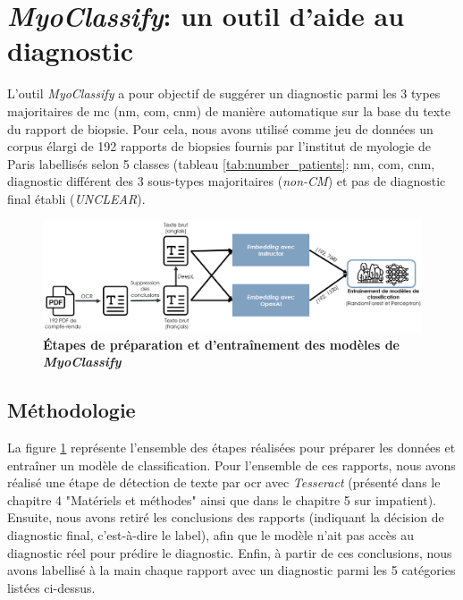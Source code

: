 \section{\textit{MyoClassify}: un outil d'aide au diagnostic}
L'outil \textit{MyoClassify} a pour objectif de suggérer un diagnostic parmi les 3 types majoritaires de \gls{mc} (\gls{nm}, \gls{com}, \gls{cnm}) de manière automatique sur la base du texte du rapport de biopsie. Pour cela, nous avons utilisé comme jeu de données un corpus élargi de 192 rapports de biopsies fournis par l'institut de myologie de Paris labellisés selon 5 classes (tableau \ref{tab:number_patients}: \gls{nm}, \gls{com}, \gls{cnm}, diagnostic différent des 3 sous-types majoritaires (\textit{non-CM}) et pas de diagnostic final établi (\textit{UNCLEAR}).
\begin{figure}[!ht]
 \centering
 \includegraphics[width=1\textwidth]{figures/myoclassify_flow.png}
 \caption[Entraînement modèle \textit{MyoClassify}]{\textbf{Étapes de préparation et d'entraînement des modèles de \textit{MyoClassify}}}
 \label{fig:myoclassify_flow}
\end{figure}
\subsection{Méthodologie}
La figure \ref{fig:myoclassify_flow} représente l'ensemble des étapes réalisées pour préparer les données et entraîner un modèle de classification. Pour l'ensemble de ces rapports, nous avons réalisé une étape de détection de texte par \gls{ocr} avec \textit{Tesseract} (présenté dans le chapitre 4 "Matériels et méthodes" ainsi que dans le chapitre 5 sur \gls{impatient}). Ensuite, nous avons retiré les conclusions des rapports (indiquant la décision de diagnostic final, c'est-à-dire le label), afin que le modèle n'ait pas accès au diagnostic réel pour prédire le diagnostic. Enfin, à partir de ces conclusions, nous avons labellisé à la main chaque rapport avec un diagnostic parmi les 5 catégories listées ci-dessus.

